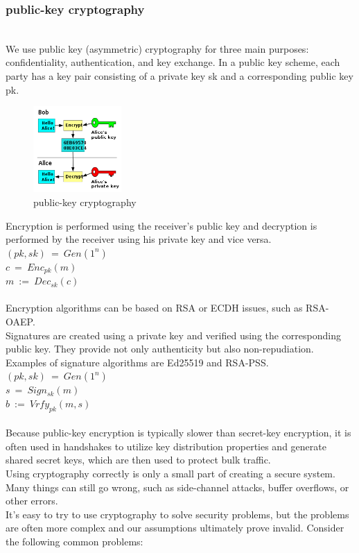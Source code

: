 \subsubsection{public-key cryptography}\cite{b38}
\\
We use public key (asymmetric) cryptography for three main purposes: confidentiality, 
authentication, and key exchange. In a public key scheme, each party has a key pair 
consisting of a private key sk and a corresponding public key pk.
\begin{figure}[H] %
    \centering %
    \includegraphics[width=0.3\textwidth]{figures/public_key.png} %
    \caption{public-key cryptography} %
    \label{Fig.2: public-key cryptography} %
\end{figure}
Encryption is performed using the receiver's public key and decryption is performed 
by the receiver using his private key and vice versa.
\\
$(pk, sk) \ = \ Gen(1^n)$
\\
$c \ = \ Enc_{pk}(m)$
\\
$m \ := \ Dec_{sk}(c)$
\\
\\
Encryption algorithms can be based on RSA or ECDH issues, such as RSA-OAEP.
\\
Signatures are created using a private key and verified using the corresponding public key. 
They provide not only authenticity but also non-repudiation. Examples of signature algorithms 
are Ed25519 and RSA-PSS.
\\
$(pk, sk) \ = \ Gen(1^n)$
\\
$s \ = \ Sign_{sk}(m)$
\\
$b \ := \ Vrfy_{pk}(m, s)$
\\
\\
Because public-key encryption is typically slower than secret-key encryption, it is often 
used in handshakes to utilize key distribution properties and generate shared secret keys, 
which are then used to protect bulk traffic.
\\
Using cryptography correctly is only a small part of creating a secure system. Many things 
can still go wrong, such as side-channel attacks, buffer overflows, or other errors.
\\
It's easy to try to use cryptography to solve security problems, but the problems are often 
more complex and our assumptions ultimately prove invalid. Consider the following common problems:

